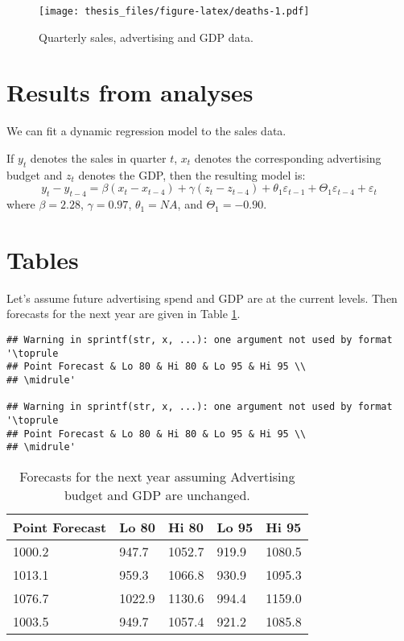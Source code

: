 \documentclass[doubleside,doublespace]{aucklandthesis}
\begin{document}
\begin{figure}
\centering
\texttt{[image: thesis\_files/figure-latex/deaths-1.pdf]}
\caption{\label{fig:deaths}Quarterly sales, advertising and GDP data.}
\end{figure}

\hypertarget{results-from-analyses}{%
\section{Results from analyses}\label{results-from-analyses}}

We can fit a dynamic regression model to the sales data.

If \(y_t\) denotes the sales in quarter \(t\), \(x_t\) denotes the corresponding advertising budget and \(z_t\) denotes the GDP, then the resulting model is:
\begin{equation}
  y_t - y_{t-4} = \beta (x_t-x_{t-4}) + \gamma (z_t-z_{t-4}) + \theta_1 \varepsilon_{t-1} + \Theta_1 \varepsilon_{t-4} + \varepsilon_t
\end{equation}
where
\(\beta = 2.28\),
\(\gamma = 0.97\),
\(\theta_1 = NA\),
and
\(\Theta_1 = -0.90\).

\hypertarget{tables}{%
\section{Tables}\label{tables}}

Let's assume future advertising spend and GDP are at the current levels. Then forecasts for the next year are given in Table \ref{tab:salesforecasts}.

\begin{verbatim}
## Warning in sprintf(str, x, ...): one argument not used by format '\toprule
## Point Forecast & Lo 80 & Hi 80 & Lo 95 & Hi 95 \\
## \midrule'

## Warning in sprintf(str, x, ...): one argument not used by format '\toprule
## Point Forecast & Lo 80 & Hi 80 & Lo 95 & Hi 95 \\
## \midrule'
\end{verbatim}

\begin{table}[ht]
\begin{center}
\begin{tabular}{lllll}
\toprule
Point Forecast & Lo 80 & Hi 80 & Lo 95 & Hi 95 \\
\midrule
1000.2 &  947.7 & 1052.7 & 919.9 & 1080.5 \\
1013.1 &  959.3 & 1066.8 & 930.9 & 1095.3 \\
1076.7 & 1022.9 & 1130.6 & 994.4 & 1159.0 \\
1003.5 &  949.7 & 1057.4 & 921.2 & 1085.8 \\
\bottomrule
\end{tabular}
\caption{Forecasts for the next year assuming Advertising budget and GDP are unchanged.}
\label{tab:salesforecasts}
\end{center}
\end{table}
\end{document}
